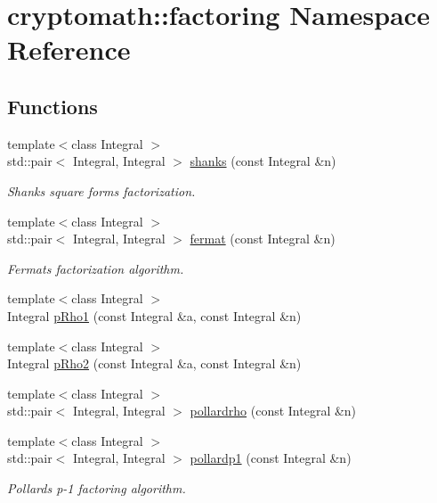 \hypertarget{namespacecryptomath_1_1factoring}{}\section{cryptomath\+:\+:factoring Namespace Reference}
\label{namespacecryptomath_1_1factoring}
\subsection*{Functions}
\begin{DoxyCompactItemize}
\item 
{\footnotesize template$<$class Integral $>$ }\\std\+::pair$<$ Integral, Integral $>$ \hyperlink{namespacecryptomath_1_1factoring_a33e645e34227080e657d9c366d9b0e9b}{shanks} (const Integral \&n)
\begin{DoxyCompactList}\small\item\em Shanks\textquotesingle{} square forms factorization. \end{DoxyCompactList}\item 
{\footnotesize template$<$class Integral $>$ }\\std\+::pair$<$ Integral, Integral $>$ \hyperlink{namespacecryptomath_1_1factoring_ae33e833ece59c1b1b23a77397dc01e95}{fermat} (const Integral \&n)
\begin{DoxyCompactList}\small\item\em Fermat\textquotesingle{}s factorization algorithm. \end{DoxyCompactList}\item 
{\footnotesize template$<$class Integral $>$ }\\Integral \hyperlink{namespacecryptomath_1_1factoring_a3704974d2db3229d70a82ebcb33a0516}{p\+Rho1} (const Integral \&a, const Integral \&n)
\item 
{\footnotesize template$<$class Integral $>$ }\\Integral \hyperlink{namespacecryptomath_1_1factoring_ac3a437caacf2d5051c2c052495abaeeb}{p\+Rho2} (const Integral \&a, const Integral \&n)
\item 
{\footnotesize template$<$class Integral $>$ }\\std\+::pair$<$ Integral, Integral $>$ \hyperlink{namespacecryptomath_1_1factoring_a99ecf3ad17c5768de52218f3178ecd29}{pollardrho} (const Integral \&n)
\item 
{\footnotesize template$<$class Integral $>$ }\\std\+::pair$<$ Integral, Integral $>$ \hyperlink{namespacecryptomath_1_1factoring_a219073421eb9727c2b6433fa59f027b9}{pollardp1} (const Integral \&n)
\begin{DoxyCompactList}\small\item\em Pollard\textquotesingle{}s p-\/1 factoring algorithm. \end{DoxyCompactList}\end{DoxyCompactItemize}


